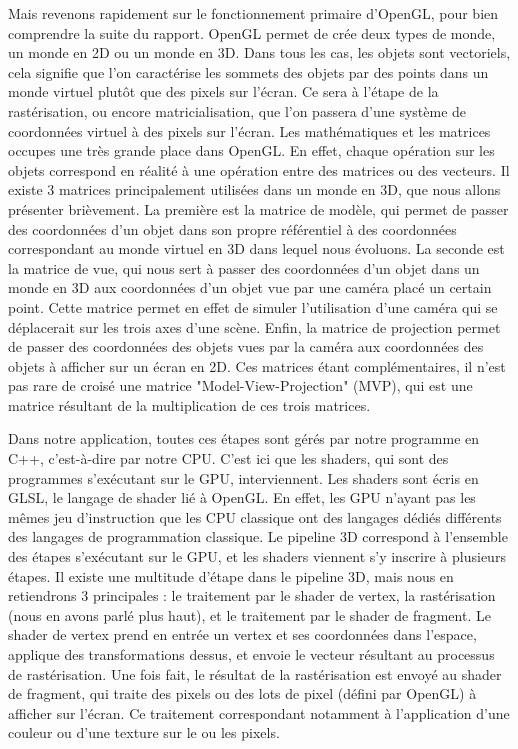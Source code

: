 \documentclass[11pt]{article}
\begin{document}
Mais revenons rapidement sur le fonctionnement primaire d'OpenGL, pour bien
comprendre la suite du rapport. OpenGL permet de crée deux types de monde, un
monde en 2D ou un monde en 3D. Dans tous les cas, les objets sont vectoriels,
cela signifie que l'on caractérise les sommets des objets par des points dans un
monde virtuel plutôt que des pixels sur l'écran. Ce sera à l'étape de la
rastérisation, ou encore matricialisation, que l'on passera d'une système de
coordonnées virtuel à des pixels sur l'écran. Les mathématiques et les matrices
occupes une très grande place dans OpenGL. En effet, chaque opération sur les
objets correspond en réalité à une opération entre des matrices ou des vecteurs.
Il existe 3 matrices principalement utilisées dans un monde en 3D, que nous
allons présenter brièvement. La première est la matrice de modèle, qui permet de
passer des coordonnées d'un objet dans son propre référentiel à des coordonnées
correspondant au monde virtuel en 3D dans lequel nous évoluons. La seconde est
la matrice de vue, qui nous sert à passer des coordonnées d'un objet dans un
monde en 3D aux coordonnées d'un objet vue par une caméra placé un certain
point. Cette matrice permet en effet de simuler l'utilisation d'une caméra qui
se déplacerait sur les trois axes d'une scène. Enfin, la matrice de projection
permet de passer des coordonnées des objets vues par la caméra aux coordonnées
des objets à afficher sur un écran en 2D. Ces matrices étant complémentaires, il
n'est pas rare de croisé une matrice "Model-View-Projection" (MVP), qui est une
matrice résultant de la multiplication de ces trois matrices.

Dans notre application, toutes ces étapes sont gérés par notre programme en C++,
c'est-à-dire par notre CPU. C'est ici que les shaders, qui sont des programmes
s'exécutant sur le GPU, interviennent. Les shaders sont écris en GLSL, le
langage de shader lié à OpenGL. En effet, les GPU n'ayant pas les mêmes jeu
d'instruction que les CPU classique ont des langages dédiés différents des
langages de programmation classique. Le pipeline 3D correspond à l'ensemble des
étapes s'exécutant sur le GPU, et les shaders viennent s'y inscrire à plusieurs
étapes. Il existe une multitude d'étape dans le pipeline 3D, mais nous en
retiendrons 3 principales : le traitement par le shader de vertex, la
rastérisation (nous en avons parlé plus haut), et le traitement par le shader de
fragment. Le shader de vertex prend en entrée un vertex et ses coordonnées dans
l'espace, applique des transformations dessus, et envoie le vecteur résultant au
processus de rastérisation. Une fois fait, le résultat de la rastérisation est
envoyé au shader de fragment, qui traite des pixels ou des lots de pixel (défini
par OpenGL) à afficher sur l'écran. Ce traitement correspondant notamment à
l'application d'une couleur ou d'une texture sur le ou les pixels.
\end{document}
